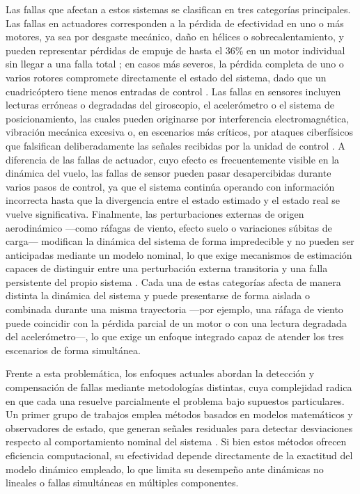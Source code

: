 \noindent Las fallas que afectan a estos sistemas se clasifican en 
tres categorías principales. Las fallas en actuadores corresponden 
a la pérdida de efectividad en uno o más motores, ya sea por 
desgaste mecánico, daño en hélices o sobrecalentamiento, y pueden 
representar pérdidas de empuje de hasta el 36\% en un motor 
individual sin llegar a una falla total \cite{kim2025, 
amoozgar2013}; en casos más severos, la pérdida completa de uno o 
varios rotores compromete directamente el estado del 
sistema, dado que un cuadricóptero tiene menos entradas de control
\cite{wang2022, du2023}. Las fallas en sensores incluyen lecturas 
erróneas o degradadas del giroscopio, el acelerómetro o el sistema 
de posicionamiento, las cuales pueden originarse por interferencia 
electromagnética, vibración mecánica excesiva o, en escenarios más 
críticos, por ataques ciberfísicos que falsifican deliberadamente 
las señales recibidas por la unidad de control 
\cite{patan2022, bekhiti2025}. A diferencia de las fallas de 
actuador, cuyo efecto es frecuentemente visible en la dinámica del 
vuelo, las fallas de sensor pueden pasar desapercibidas durante 
varios pasos de control, ya que el sistema continúa operando con 
información incorrecta hasta que la divergencia entre el estado 
estimado y el estado real se vuelve significativa. Finalmente, las 
perturbaciones externas de origen aerodinámico —como ráfagas de 
viento, efecto suelo o variaciones súbitas de carga— modifican la 
dinámica del sistema de forma impredecible y no pueden ser 
anticipadas mediante un modelo nominal, lo que exige mecanismos de 
estimación capaces de distinguir entre una perturbación externa 
transitoria y una falla persistente del propio sistema 
\cite{hsu2024}. Cada una de estas categorías afecta de manera 
distinta la dinámica del sistema y puede presentarse de forma 
aislada o combinada durante una misma trayectoria —por ejemplo, una 
ráfaga de viento puede coincidir con la pérdida parcial de un motor 
o con una lectura degradada del acelerómetro—, lo que exige un 
enfoque integrado capaz de atender los tres escenarios de forma 
simultánea.


\noindent Frente a esta problemática, los enfoques actuales abordan 
la detección y compensación de fallas mediante metodologías 
distintas, cuya complejidad radica en que cada una resuelve 
parcialmente el problema bajo supuestos particulares. Un primer 
grupo de trabajos emplea métodos basados en modelos matemáticos y 
observadores de estado, que generan señales residuales para 
detectar desviaciones respecto al comportamiento nominal del 
sistema \cite{freddi2019, patan2022, du2023}. Si bien estos métodos 
ofrecen eficiencia computacional, su efectividad depende 
directamente de la exactitud del modelo dinámico empleado, lo que 
limita su desempeño ante dinámicas no lineales o fallas simultáneas 
en múltiples componentes.


